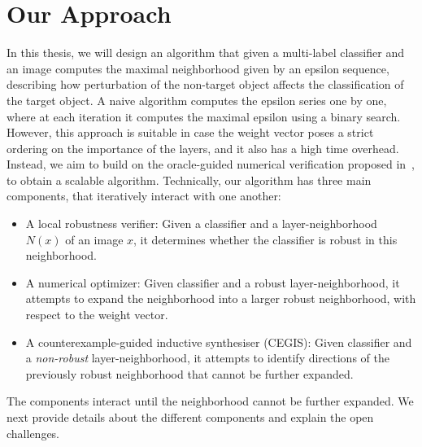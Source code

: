 
\section{Our Approach}

In this thesis, we will design an algorithm that given a multi-label classifier and an image computes the maximal neighborhood given by an epsilon sequence, describing how perturbation of the non-target object affects the classification of the target object.
A naive algorithm computes the epsilon series one by one, where at each iteration it computes the maximal epsilon using a binary search.
However, this approach is suitable in case the weight vector poses a strict ordering on the importance of the layers, and it also has a high time overhead.
Instead, we aim to build on the oracle-guided numerical verification proposed in~\cite{MARVEL}, to obtain a scalable algorithm.
Technically, our algorithm has three main components, that iteratively interact with one another:
\begin{itemize}
    \item A local robustness verifier: Given a classifier and a layer-neighborhood $N(x)$ of an image $x$, it determines whether the classifier is robust in this neighborhood. 
        \item A numerical optimizer: Given classifier and a robust layer-neighborhood, it attempts to expand the neighborhood into a larger robust neighborhood, with respect to the weight vector. %
    \item A counterexample-guided inductive synthesiser (CEGIS): Given classifier and a \emph{non-robust} layer-neighborhood, it attempts to identify directions of the previously robust neighborhood that cannot be further expanded. 
    \end{itemize}
The components interact until the neighborhood cannot be further expanded.
We next provide details about the different components and explain the open challenges.

